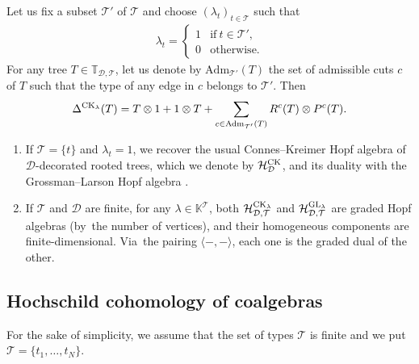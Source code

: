 \documentclass[10pt,a4paper]{amsart}
\numberwithin{equation}{section}
\newcommand{\K}{\mathbb{K}}
\newcommand{\T}{\mathcal{T}}
\newcommand{\D}{\mathcal{D}}
\newcommand{\adm}{\mathrm{Adm}}
\newcommand{\h}{\mathcal{H}}
\newcommand{\bfT}{\mathbb{T}}
\begin{document}
\begin{Example}
Let us fix a subset $\T'$ of $\T$ and choose $(\lambda_t)_{t\in \T}$ such that
\begin{gather*}
\lambda_t=\begin{cases}
1&\mbox{if} \ t\in \T',
\\
0&\mbox{otherwise}.
\end{cases}\end{gather*}
For any tree $T\in \bfT_{\D,\T}$, let us denote by $\adm_{\T'}(T)$ the set of admissible cuts $c$ of $T$ such that
the type of any edge in $c$ belongs to $\T'$. Then
\begin{gather*}
\Delta^{{\rm CK}_\lambda}(T)=T\otimes 1+1\otimes T+\sum_{c\in \adm_{\T'}(T)} R^c(T)\otimes P^c(T).
\end{gather*}
\end{Example}

\begin{Remark}\quad \begin{enumerate}\itemsep=0pt
\item If $\T=\{t\}$ and $\lambda_t=1$, we recover the usual Connes--Kreimer Hopf algebra of $\D$-decorated rooted trees,
which we denote by $\h_{\D}^{{\rm CK}}$, and its duality with the Grossman--Larson Hopf algebra
\cite{ConnesKreimer,Hoffman,Panaite}.
\item If $\T$ and $\D$ are finite, for any $\lambda\in \K^\T$, both $\h_{\D,\T}^{{\rm CK}_\lambda}$ and $\h_{\D,\T}^{{\rm GL}_\lambda}$
are graded Hopf algebras (by~the number of vertices),
and their homogeneous components are finite-dimensional.
Via~the pairing $\langle-,-\rangle$, each one is the graded dual of the other.
\end{enumerate}
\end{Remark}

\subsection{Hochschild cohomology of coalgebras}

For the sake of simplicity, we assume that the set of types $\T$ is finite
and we put $\T=\{t_1,\dots,t_N\}$.
\end{document}
